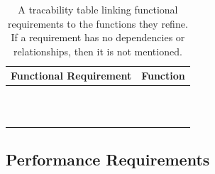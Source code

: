 \documentclass{article}
\begin{document}
\begin{table}[!h]
\begin{center}
\caption {A tracability table linking functional requirements to the functions they refine. If a requirement has no dependencies or relationships, then it is not mentioned. }
\label{TRACE_FR_Func}
\begin{tabular}{ | m{7cm} | m{7cm} | }
\hline
Functional Requirement & Function  \\
\hline
\nameref{GEN_001} & \nameref{Autonomous Explore State}  \\
\hline
\nameref{STA_000} & \nameref{Idle State}  \\
\hline
\nameref{STA_001} & \nameref{Autonomous Explore State}  \\
\hline
\nameref{STA_002} & \nameref{Manual Location Move State}  \\
\hline
\nameref{STA_003} & \nameref{Autonomous Explore State}  \\
\hline
\nameref{STA_004} & \nameref{Configure State}  \\
\hline
\nameref{STA_005} & \nameref{Off State}  \\
\hline
\nameref{STA_006} & \nameref{Land State}  \\
\hline
\nameref{STA_007} & \nameref{Desired Location Error State}  \\
\hline
\nameref{STA_008} & \nameref{No Parking Lot Detected Error State}  \\
\hline
\nameref{STA_009} & \nameref{Malfunction State}  \\
\hline
\end{tabular}
\end{center}
\end{table}

\clearpage
\newpage

\subsection{Performance Requirements}
\end{document}

